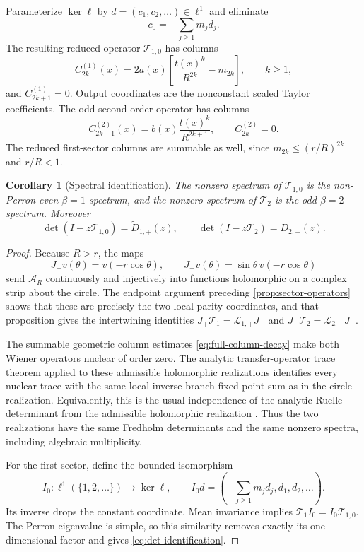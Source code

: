\documentclass[11pt]{article}
\newtheorem{corollary}[theorem]{Corollary}
\theoremstyle{definition}
\theoremstyle{remark}
\newcommand{\cA}{\mathcal A}
\newcommand{\cL}{\mathcal L}
\newcommand{\cT}{\mathcal T}
\begin{document}
Parameterize $\ker\ell$ by $d=(c_1,c_2,\ldots)\in\ell^1$ and eliminate
\begin{equation}\label{eq:c0-elimination}
 c_0=-\sum_{j\ge1}m_jd_j.
\end{equation}
The resulting reduced operator $\cT_{1,0}$ has columns
\begin{equation}\label{eq:T10-columns}
 C^{(1)}_{2k}(x)
 =2a(x)\left[\frac{t(x)^k}{R^{2k}}-m_{2k}\right],
 \qquad k\ge1,
\end{equation}
and $C^{(1)}_{2k+1}=0$.  Output coordinates are the nonconstant scaled Taylor
coefficients.  The odd second-order operator has columns
\begin{equation}\label{eq:T2-columns}
 C^{(2)}_{2k+1}(x)=b(x)\frac{t(x)^k}{R^{2k+1}},
 \qquad
 C^{(2)}_{2k}=0.
\end{equation}
The reduced first-sector columns are summable as well, since
$m_{2k}\le(r/R)^{2k}$ and $r/R<1$.

\begin{corollary}[Spectral identification]
\label{cor:spectral-identification}
The nonzero spectrum of $\cT_{1,0}$ is the non-Perron even $\beta=1$
spectrum, and the nonzero spectrum of $\cT_2$ is the odd $\beta=2$ spectrum.
Moreover
\begin{equation}\label{eq:det-identification}
 \det(I-z\cT_{1,0})=\widetilde D_{1,+}(z),
 \qquad
 \det(I-z\cT_2)=D_{2,-}(z).
\end{equation}
\end{corollary}

\begin{proof}
Because $R>r$, the maps
\[
 J_+v(\theta)=v(-r\cos\theta),
 \qquad
 J_-v(\theta)=\sin\theta\,v(-r\cos\theta)
\]
send $\cA_R$ continuously and injectively into functions holomorphic on a
complex strip about the circle.  The endpoint argument preceding
\cref{prop:sector-operators} shows that these are precisely the two local
parity coordinates, and that proposition gives the intertwining identities
$J_+\cT_1=\cL_{1,+}J_+$ and
$J_-\cT_2=\cL_{2,-}J_-$.

The summable geometric column estimates \eqref{eq:full-column-decay} make both
Wiener operators nuclear of order zero.  The analytic transfer-operator trace
theorem applied to these admissible holomorphic realizations identifies every
nuclear trace with the same local inverse-branch fixed-point sum as in the
circle realization.  Equivalently, this is the usual independence of the
analytic Ruelle determinant from the admissible holomorphic realization
\citep{Ruelle1976,Baladi2000,Baladi2018}.  Thus the two realizations have the
same Fredholm determinants and the same nonzero spectra, including algebraic
multiplicity.

For the first sector, define the bounded isomorphism
\[
 I_0:\ell^1(\{1,2,\ldots\})\longrightarrow\ker\ell,
 \qquad
 I_0d=\left(-\sum_{j\ge1}m_jd_j,d_1,d_2,\ldots\right).
\]
Its inverse drops the constant coordinate.  Mean invariance implies
$\cT_1I_0=I_0\cT_{1,0}$.  The Perron eigenvalue is simple, so this similarity
removes exactly its one-dimensional factor and gives
\eqref{eq:det-identification}.
\end{proof}
\end{document}

